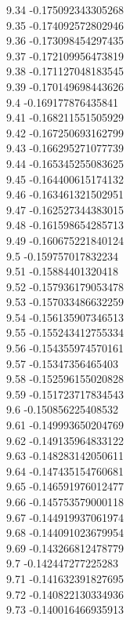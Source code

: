 {9.34	-0.175092343305268\\
9.35	-0.174092572802946\\
9.36	-0.173098454297435\\
9.37	-0.172109956473819\\
9.38	-0.171127048183545\\
9.39	-0.170149698443626\\
9.4	-0.169177876435841\\
9.41	-0.168211551505929\\
9.42	-0.167250693162799\\
9.43	-0.166295271077739\\
9.44	-0.165345255083625\\
9.45	-0.164400615174132\\
9.46	-0.163461321502951\\
9.47	-0.162527344383015\\
9.48	-0.161598654285713\\
9.49	-0.160675221840124\\
9.5	-0.159757017832234\\
9.51	-0.15884401320418\\
9.52	-0.157936179053478\\
9.53	-0.157033486632259\\
9.54	-0.156135907346513\\
9.55	-0.155243412755334\\
9.56	-0.154355974570161\\
9.57	-0.15347356465403\\
9.58	-0.152596155020828\\
9.59	-0.151723717834543\\
9.6	-0.150856225408532\\
9.61	-0.149993650204769\\
9.62	-0.149135964833122\\
9.63	-0.148283142050611\\
9.64	-0.147435154760681\\
9.65	-0.146591976012477\\
9.66	-0.145753579000118\\
9.67	-0.144919937061974\\
9.68	-0.144091023679954\\
9.69	-0.143266812478779\\
9.7	-0.142447277225283\\
9.71	-0.141632391827695\\
9.72	-0.140822130334936\\
9.73	-0.140016466935913\\
}
